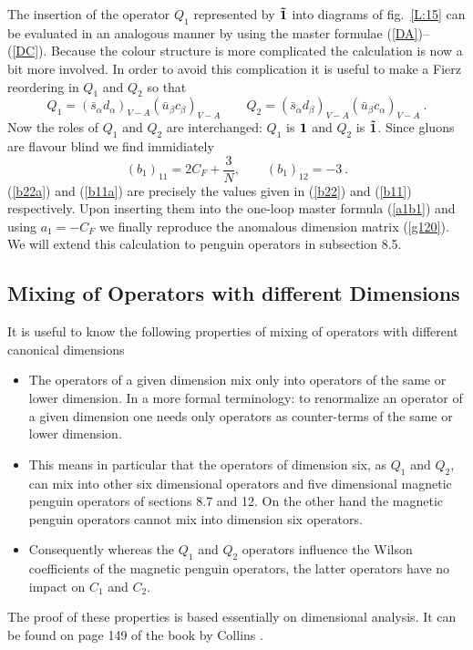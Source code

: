\documentclass[12pt]{article}
\newcommand{\be}{\begin{equation}}
\newcommand{\ee}{\end{equation}}
\newcommand{\bi}{\begin{itemize}}
\newcommand{\ei}{\end{itemize}}
\begin{document}
\begin{itemize}
\begin{itemize}
\begin{itemize}
The insertion of the operator $Q_1$ represented by ${\bf \tilde 1}$
into diagrams of fig.~\ref{L:15} can be evaluated in an analogous manner
by using the master formulae (\ref{DA})--(\ref{DC}). Because the
colour structure is more complicated the calculation is now a bit more
involved. In order to avoid this complication it is useful to
make a Fierz reordering in $Q_1$ and $Q_2$ so that
\be\label{fierz}
Q_1=(\bar s_\alpha d_\alpha)_{V-A}(\bar u_\beta c_\beta)_{V-A}\quad\quad
Q_2=(\bar s_\alpha d_\beta)_{V-A}(\bar u_\beta c_\alpha)_{V-A}~.
\ee
Now the roles of $Q_1$ and $Q_2$ are interchanged: $Q_1$ is ${\bf 1}$
and $Q_2$ is ${\bf\tilde 1}$. Since gluons are flavour blind we
find immidiately
\be\label{b11a}
(b_1)_{11}=2 C_F+\frac{3}{N},
\quad\quad
(b_1)_{12}=-3~.
\ee
(\ref{b22a}) and (\ref{b11a}) are precisely the values given in 
(\ref{b22}) and (\ref{b11}) respectively.
Upon
inserting them into the one-loop master formula (\ref{a1b1}) and using
$a_1=-C_F$ we finally
reproduce the anomalous dimension matrix 
(\ref{g120}). We will extend this calculation to penguin operators in
subsection 8.5. 

\subsection{Mixing of Operators with different Dimensions}
It is useful to know the following properties of mixing of operators
with different canonical dimensions
\bi
\item
The operators of a given dimension mix only into operators of the
same or lower dimension. In a more formal terminology: to
renormalize an operator of a given dimension one needs only 
operators as counter-terms of the same or lower dimension.
\item
This means in particular that the operators of dimension six,
as $Q_1$ and $Q_2$, can mix into other six dimensional operators
and five dimensional magnetic penguin operators of sections 8.7 and 12.
On the other hand the magnetic penguin operators cannot mix into
dimension six operators.
\item
Consequently whereas the $Q_1$ and $Q_2$ operators influence the
Wilson coefficients of the magnetic penguin operators, the
latter operators have no impact on $C_1$ and $C_2$.
\ei

The proof of these properties is based essentially on dimensional
analysis. It can be found on page 149 of the book by Collins 
\cite{Collins}.


\end{itemize}
\end{itemize}
\end{itemize}
\end{document}

